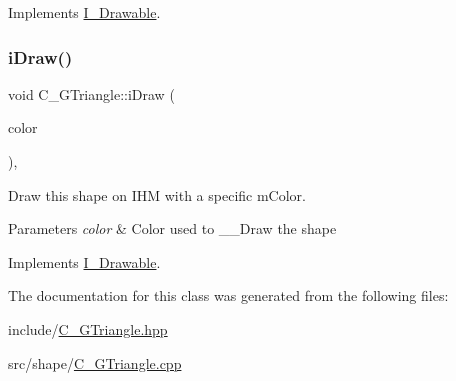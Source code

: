 Implements \hyperlink{classI__Drawable_a25f6474325614c451a91f019e5fe8010}{I\+\_\+\+Drawable}.

\mbox{\label{classC__GTriangle_a9cfd20cb1d19e6c92bd217c470c86405}} 
\subsubsection{\texorpdfstring{i\+Draw()}{iDraw()}\hspace{0.1cm}{\footnotesize\ttfamily [4/4]}}
{\footnotesize\ttfamily void C\+\_\+\+G\+Triangle\+::i\+Draw (\begin{DoxyParamCaption}\item[{M\+L\+V\+\_\+\+Color}]{color }\end{DoxyParamCaption})\hspace{0.3cm}{\ttfamily [override]}, {\ttfamily [virtual]}}



Draw this shape on I\+HM with a specific m\+Color. 


\begin{DoxyParams}{Parameters}
{\em color} & Color used to \+\_\+\+\_\+\+Draw the shape \\
\hline
\end{DoxyParams}


Implements \hyperlink{classI__Drawable_a25f6474325614c451a91f019e5fe8010}{I\+\_\+\+Drawable}.



The documentation for this class was generated from the following files\+:\begin{DoxyCompactItemize}
\item 
include/\hyperlink{C__GTriangle_8hpp}{C\+\_\+\+G\+Triangle.\+hpp}\item 
src/shape/\hyperlink{C__GTriangle_8cpp}{C\+\_\+\+G\+Triangle.\+cpp}\end{DoxyCompactItemize}
